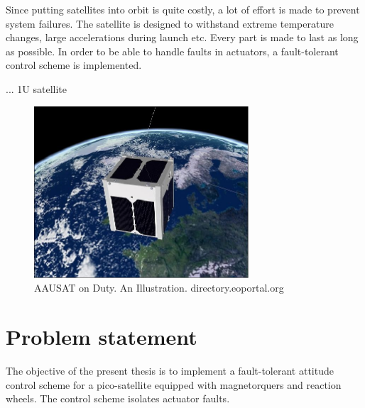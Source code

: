 
 Since putting satellites into orbit is quite costly, a lot of effort is made to prevent system failures. The satellite is designed to withstand extreme temperature changes, large accelerations during launch etc. Every part is made to last as long as possible. In order to be able to handle faults in actuators, a fault-tolerant control scheme is implemented.
 
 ... 1U satellite
 
 
 
 
 \begin{figure}%
 	\centering 
 	\includegraphics[width=80mm]{figures/aausatInSpace.jpg}	
 	\caption{AAUSAT on Duty. An Illustration. directory.eoportal.org}
 	\label{fig:aauinspace}
 \end{figure}

 
  
 

\section{Problem statement}
The objective of the present thesis is to implement a fault-tolerant attitude control scheme for a pico-satellite equipped with magnetorquers and reaction wheels. The control scheme isolates actuator faults.



